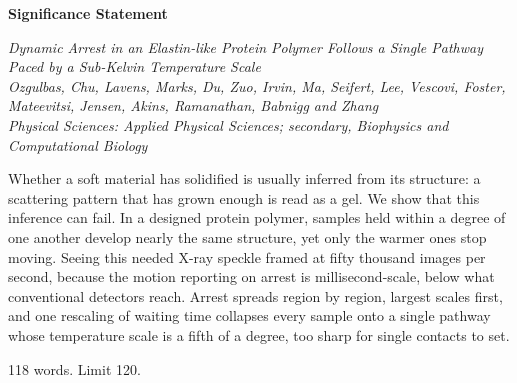 \documentclass[11pt]{article}
\begin{document}
{\large\bfseries Significance Statement}

\vspace{0.6em}

{\footnotesize\itshape
Dynamic Arrest in an Elastin-like Protein Polymer Follows a Single Pathway
Paced by a Sub-Kelvin Temperature Scale \\
Ozgulbas, Chu, Lavens, Marks, Du, Zuo, Irvin, Ma, Seifert, Lee, Vescovi,
Foster, Mateevitsi, Jensen, Akins, Ramanathan, Babnigg and Zhang \\
Physical Sciences: Applied Physical Sciences; secondary, Biophysics and
Computational Biology}

\vspace{1.2em}

Whether a soft material has solidified is usually inferred from its structure:
a scattering pattern that has grown enough is read as a gel. We show that this
inference can fail. In a designed protein polymer, samples held within a degree
of one another develop nearly the same structure, yet only the warmer ones stop
moving. Seeing this needed X-ray speckle framed at fifty thousand images per
second, because the motion reporting on arrest is millisecond-scale, below what
conventional detectors reach. Arrest spreads region by region, largest scales
first, and one rescaling of waiting time collapses every sample onto a single
pathway whose temperature scale is a fifth of a degree, too sharp for single
contacts to set.

\vspace{1.4em}

{\footnotesize 118 words. Limit 120.}
\end{document}
